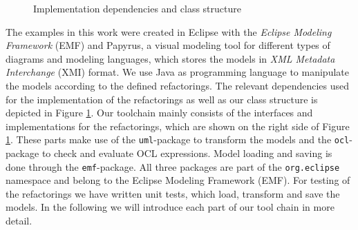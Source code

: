 \documentclass{llncs}
\begin{document}
\begin{figure}
 \caption{Implementation dependencies and class structure}
 \label{fig:toolchain}
\end{figure}

The examples in this work were created in Eclipse with the \textit{Eclipse Modeling Framework} \cite{Steinberg:2009:EEM:1197540} 
(EMF) and Papyrus, a visual modeling tool for different types of diagrams and modeling languages, which stores the models 
in \textit{XML Metadata Interchange} \cite{man:XMI} (XMI) format. We use Java as programming language to manipulate 
the models according to the defined refactorings. The relevant dependencies used for the implementation of the refactorings 
as well as our class structure is depicted in Figure \ref{fig:toolchain}. Our toolchain mainly consists of the interfaces and
implementations for the refactorings, which are shown on the right side of Figure \ref{fig:toolchain}. These parts make use of the
\texttt{uml}-package to transform the models and the \texttt{ocl}-package to check and evaluate OCL expressions. Model loading and saving
is done through the \texttt{emf}-package. All three packages are part of the \texttt{org.eclipse} namespace and belong to the Eclipse 
Modeling Framework (EMF). For testing of the refactorings we have written unit tests, which load, transform and 
save the models. In the following we will introduce each part of our tool chain in more detail.

\end{document}
